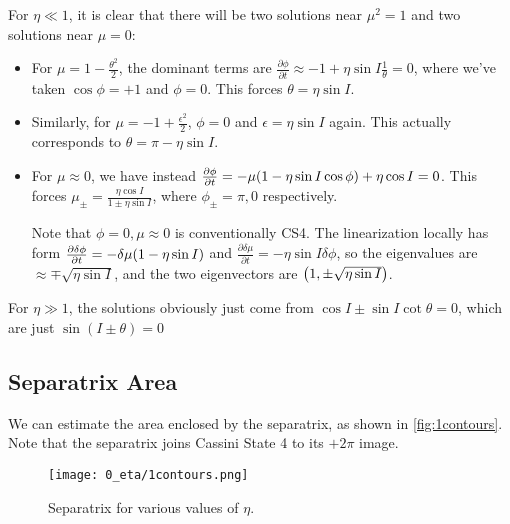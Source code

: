 \documentclass[11pt,
        usenames, %
        dvipsnames %
    ]{article}
\newcommand*{\pd}[2]{\frac{\partial#1}{\partial#2}}
\DeclarePairedDelimiter\p{\lparen}{\rparen}
\begin{document}
For $\eta \ll 1$, it is clear that there will be two solutions near $\mu^2 = 1$
and two solutions near $\mu = 0$:
\begin{itemize}
    \item For $\mu = 1 - \frac{\theta^2}{2}$, the dominant terms are
        $\pd{\phi}{t} \approx -1 + \eta \sin I \frac{1}{\theta} = 0$,
        where we've taken $\cos \phi = +1$ and $\phi = 0$. This forces $\theta
        = \eta \sin I$.

    \item Similarly, for $\mu = -1 + \frac{\epsilon^2}{2}$, $\phi = 0$ and
        $\epsilon = \eta \sin I$ again. This actually corresponds to $\theta =
        \pi - \eta \sin I$.

    \item For $\mu \approx 0$, we have instead $\pd{\phi}{t} = -\mu\p*{1 - \eta
        \sin I \cos \phi} + \eta \cos I = 0$. This forces $\mu_\pm = \frac{\eta
        \cos I}{1 \pm \eta \sin I}$, where $\phi_{\pm} = \pi, 0$ respectively.

        Note that $\phi = 0, \mu \approx 0$ is conventionally CS4. The
        linearization locally has form $\pd{\delta \phi}{t} = -\delta \mu\p*{1 -
        \eta \sin I}$ and $\pd{\delta \mu}{t} = -\eta \sin I \delta \phi$, so
        the eigenvalues are $\approx \mp \sqrt{\eta \sin I}$, and the two
        eigenvectors are $\p*{1, \pm \sqrt{\eta \sin I}}$.
\end{itemize}

For $\eta \gg 1$, the solutions obviously just come from $\cos I \pm \sin I \cot
\theta = 0$, which are just $\sin (I \pm \theta) = 0$

\subsection{Separatrix Area}

We can estimate the area enclosed by the separatrix, as shown in
\autoref{fig:1contours}. Note that the separatrix joins Cassini State 4 to its
$+ 2\pi$ image.
\begin{figure}[t]
    \centering
    \texttt{[image: 0\_eta/1contours.png]}
    \caption{Separatrix for various values of $\eta$.}\label{fig:1contours}
\end{figure}
\end{document}
